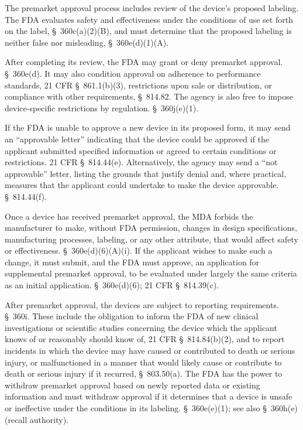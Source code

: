 {  The premarket approval process includes review of the device's
proposed labeling. The FDA evaluates safety and effectiveness under
the conditions of use set forth on the label, \S~360c(a)(2)(B),
and must determine that the proposed labeling is neither false nor
misleading, \S~360e(d)(1)(A). \newpage 


  After completing its review, the FDA may grant or deny premarket
approval. \S~360e(d). It may also condition approval on adherence
to performance standards, 21 CFR \S~861.1(b)(3), restrictions
upon sale or distribution, or compliance with other requirements,
\S~814.82. The agency is also free to impose device-specific
restrictions by regulation. \S~360j(e)(1).

  If the FDA is unable to approve a new device in its proposed form,
it may send an ``approvable letter'' indicating that the device
could be approved if the applicant submitted specified information or
agreed to certain conditions or restrictions. 21 CFR \S~814.44(e).
Alternatively, the agency may send a ``not approvable'' letter,
listing the grounds that justify denial and, where practical, measures
that the applicant could undertake to make the device approvable.
\S~814.44(f).

  Once a device has received premarket approval, the MDA forbids
the manufacturer to make, without FDA permission, changes in
design specifications, manufacturing processes, labeling, or
any other attribute, that would affect safety or effectiveness.
\S~360e(d)(6)(A)(i). If the applicant wishes to make such a
change, it must submit, and the FDA must approve, an application for
supplemental premarket approval, to be evaluated under largely the
same criteria as an initial application. \S~360e(d)(6); 21 CFR
\S~814.39(c).

  After premarket approval, the devices are subject to reporting
requirements. \S~360i. These include the obligation to inform the
FDA of new clinical investigations or scientific studies concerning the
device which the applicant knows of or reasonably should know of, 21
CFR \S~814.84(b)(2), and to report incidents in which the device may
have caused or contributed to death or serious injury, or malfunctioned
in a manner that would likely cause or contribute to death or serious
injury if it recurred, \S~803.50(a). The FDA has the power to
withdraw premarket approval based on newly reported data or existing
information and must withdraw ap\newpage proval if it determines that a
device is unsafe or ineffective under the conditions in its labeling.
\S~360e(e)(1); see also \S~360h(e) (recall authority).

}
